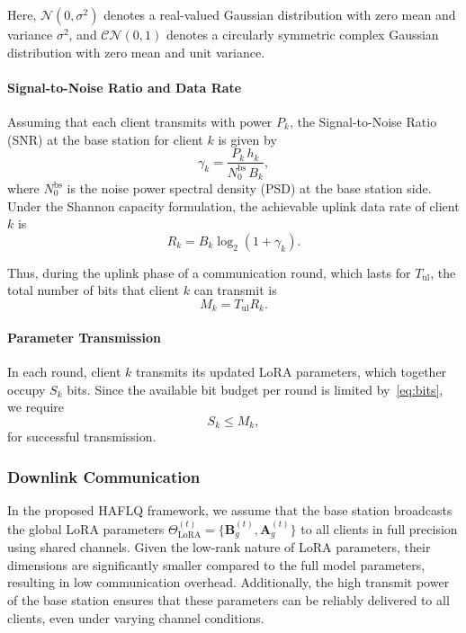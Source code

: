 \documentclass[journal]{IEEEtran}
\begin{document}
Here, \(\mathcal{N}(0, \sigma^2)\) denotes a real-valued Gaussian distribution with zero mean and variance \(\sigma^2\), and \(\mathcal{CN}(0,1)\) denotes a circularly symmetric complex Gaussian distribution with zero mean and unit variance.



\paragraph{Signal-to-Noise Ratio and Data Rate}  
Assuming that each client transmits with power $P_k$, the Signal-to-Noise Ratio (SNR) at the base station for client $k$ is given by
\begin{equation}
    \gamma_k = \frac{P_k\, h_k}{N_0^{\text{bs}}\, B_k},
    \label{eq:snr}
\end{equation}
where $N_0^{\text{bs}}$ is the noise power spectral density (PSD) at the base station side. Under the Shannon capacity formulation, the achievable uplink data rate\cite{7892899} of client $k$ is
\begin{equation}
    R_k = B_k \log_2\left(1 + \gamma_k\right).
    \label{eq:rate}
\end{equation}

Thus, during the uplink phase of a communication round, which lasts for $T_{\text{ul}}$, the total number of bits that client $k$ can transmit is
\begin{equation}
    M_k = T_{\text{ul}} R_k.
    \label{eq:bits}
\end{equation}

\paragraph{Parameter Transmission}  
In each round, client $k$ transmits its updated LoRA parameters, which together occupy $S_k$ bits. Since the available bit budget per round is limited by~\eqref{eq:bits}, we require
\begin{equation}
    S_k \le M_k,
    \label{eq:bit_constraint}
\end{equation}
for successful transmission. 

\subsubsection{Downlink Communication}
In the proposed HAFLQ framework, we assume that the base station broadcasts the global LoRA parameters \(\Theta_{\text{LoRA}}^{(t)} = \{\mathbf{B}_g^{(t)}, \mathbf{A}_g^{(t)}\}\) to all clients in full precision using shared channels. Given the low-rank nature of LoRA parameters, their dimensions are significantly smaller compared to the full model parameters, resulting in low communication overhead. Additionally, the high transmit power of the base station ensures that these parameters can be reliably delivered to all clients, even under varying channel conditions.
\end{document}
